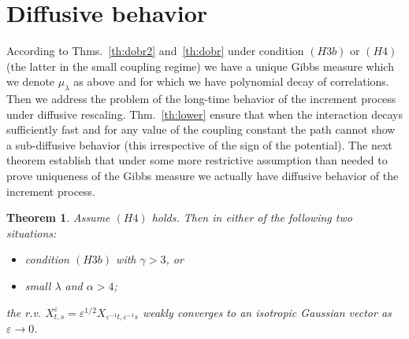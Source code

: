 \documentclass[a4paper,12pt,reqno]{amsart}
\newtheorem{theorem}{Theorem}
\newcommand{\eps}{\varepsilon}
\begin{document}
\section{Diffusive behavior}
\label{sec:diffusive}
According to Thms.~\ref{th:dobr2} and~\ref{th:dobr} under condition $(H3b)$ or $(H4)$
(the latter in the small coupling regime)  we have a unique 
Gibbs measure  which we denote $\mu_\lambda$ as above and for which we
have polynomial decay of correlations.  
Then we address the problem of  the long-time behavior of the increment
process under diffusive rescaling. Thm.~\ref{th:lower} ensure that when
the interaction decays sufficiently fast and for any value of the
coupling constant the path cannot show a sub-diffusive behavior (this
irrespective of the sign of the potential).
The next theorem establish that under some more restrictive
assumption than needed to prove uniqueness of the Gibbs measure we
actually have diffusive behavior of the increment process.


\begin{theorem} Assume $(H4)$ holds. Then in either of the following two situations:
  \begin{itemize}
\item[(a)] condition $(H3b)$ with $\gamma > 3$, or
  \item[(b)]  small $\lambda$ and $\alpha >
  4$;
  \end{itemize}
 the r.v. $X^{\eps}_{t,s} = \eps^{1/2} X_{\eps^{-1}t,\eps^{-1}s}$ weakly
converges to an isotropic
Gaussian vector as $\eps \to 0$.   
\end{theorem}
\end{document}
